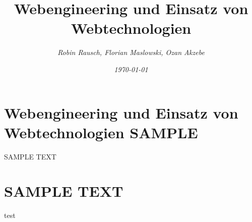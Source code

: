 \documentclass[12pt,a4paper]{article}
\author{\slshape Robin Rausch, Florian Maslowski, Ozan Akzebe}
\title{Webengineering und Einsatz von Webtechnologien}
\date{\slshape \today}
\begin{document}
\maketitle
\tableofcontents
\newpage

\section{Webengineering und Einsatz von Webtechnologien SAMPLE}
SAMPLE TEXT 

\section{SAMPLE TEXT}
test
\end{document}
